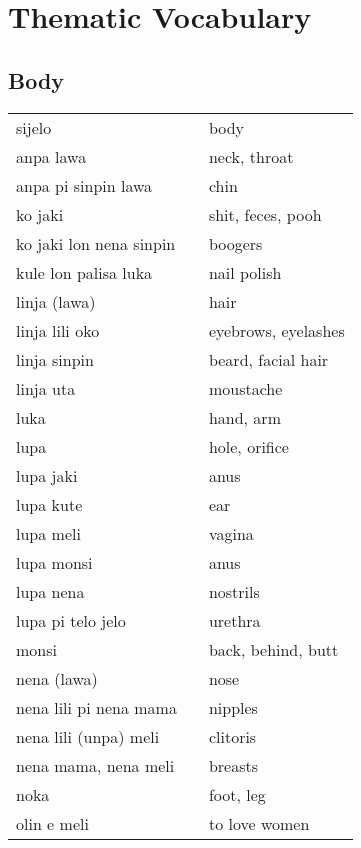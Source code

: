 \section{Thematic Vocabulary}
\label{'thematic_vocabulary'}
%
%
%
%
\subsection{Body}
%
\begin{supertabular}{p{4,5cm}|ll}
sijelo && body \\
anpa lawa && neck, throat \\
anpa pi sinpin lawa && chin \\
ko jaki && shit, feces, pooh \\
ko jaki lon nena sinpin && boogers \\
kule lon palisa luka && nail polish \\
linja (lawa) && hair \\
linja lili oko && eyebrows, eyelashes \\
linja sinpin && beard, facial hair \\
linja uta && moustache \\
luka && hand, arm \\
lupa && hole, orifice \\
lupa jaki && anus \\
lupa kute && ear \\
lupa meli && vagina \\
lupa monsi && anus \\
lupa nena && nostrils \\
lupa pi telo jelo && urethra \\
monsi && back, behind, butt \\
nena (lawa) && nose \\
nena lili pi nena mama && nipples \\
nena lili (unpa) meli && clitoris \\
nena mama, nena meli  && breasts \\
noka && foot, leg \\
olin e meli && to love women \\

\end{supertabular}
